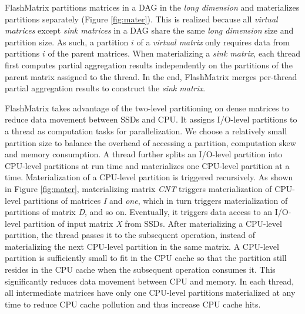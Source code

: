 FlashMatrix partitions matrices in a DAG in the \textit{long dimension} and
materializes partitions separately (Figure \ref{fig:mater}). This is realized
because all \textit{virtual matrices} except \textit{sink matrices} in a DAG
share the same \textit{long dimension} size and partition size. As such,
a partition $i$ of a \textit{virtual matrix} only requires data from partitions
$i$ of the parent matrices.
When materializing a \textit{sink matrix}, each thread first computes partial
aggregation results independently on the partitions of the parent matrix
assigned to the thread. In the end, FlashMatrix merges per-thread partial
aggregation results to construct the \textit{sink matrix}.

FlashMatrix takes advantage of the two-level partitioning on dense matrices
to reduce data movement between SSDs and CPU. It assigns I/O-level partitions
to a thread as computation tasks for parallelization. We choose a relatively
small partition size to balance the overhead of accessing a partition,
computation skew and memory consumption. A thread further splits
an I/O-level partition into CPU-level partitions at run time and materializes
one CPU-level partition at a time. Materialization of a CPU-level partition
is triggered recursively. As shown in Figure \ref{fig:mater}, materializing
matrix \textit{CNT} triggers materialization of CPU-level partitions of matrices
\textit{I} and \textit{one}, which in turn triggers materialization of
partitions of matrix \textit{D}, and so on. Eventually, it triggers data access
to an I/O-level partition of input matrix \textit{X} from SSDs.
After materializing a CPU-level partition, the thread passes it to the subsequent
operation, instead of materializing the next CPU-level partition in the same matrix.
A CPU-level partition is sufficiently small to fit in the CPU cache so that
the partition still resides in the CPU cache when the subsequent operation consumes
it. This significantly reduces data movement between CPU and memory. In each
thread, all intermediate matrices have only one CPU-level partitions materialized
at any time to reduce CPU cache pollution and thus increase CPU cache hits.


